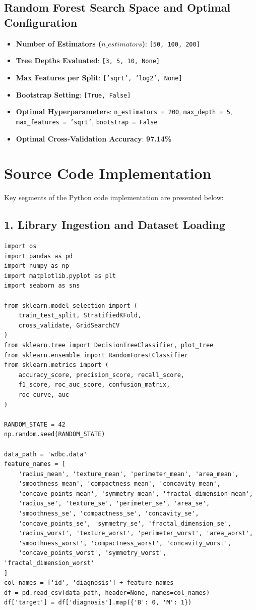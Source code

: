\documentclass[12pt,a4paper]{article}
\begin{document}
\subsection*{Random Forest Search Space and Optimal Configuration}
\begin{itemize}
\item \textbf{Number of Estimators ($n\_estimators$)}: \texttt{[50, 100, 200]}
\item \textbf{Tree Depths Evaluated}: \texttt{[3, 5, 10, None]}
\item \textbf{Max Features per Split}: \texttt{['sqrt', 'log2', None]}
\item \textbf{Bootstrap Setting}: \texttt{[True, False]}
\item \textbf{Optimal Hyperparameters}: \texttt{n\_estimators = 200}, \texttt{max\_depth = 5}, \texttt{max\_features = 'sqrt'}, \texttt{bootstrap = False}
\item \textbf{Optimal Cross-Validation Accuracy}: \textbf{97.14\%}
\end{itemize}

\section{Source Code Implementation}

Key segments of the Python code implementation are presented below:

\subsection*{1. Library Ingestion and Dataset Loading}
\begin{lstlisting}
import os
import pandas as pd
import numpy as np
import matplotlib.pyplot as plt
import seaborn as sns

from sklearn.model_selection import (
    train_test_split, StratifiedKFold,
    cross_validate, GridSearchCV
)
from sklearn.tree import DecisionTreeClassifier, plot_tree
from sklearn.ensemble import RandomForestClassifier
from sklearn.metrics import (
    accuracy_score, precision_score, recall_score,
    f1_score, roc_auc_score, confusion_matrix,
    roc_curve, auc
)

RANDOM_STATE = 42
np.random.seed(RANDOM_STATE)

data_path = 'wdbc.data'
feature_names = [
    'radius_mean', 'texture_mean', 'perimeter_mean', 'area_mean',
    'smoothness_mean', 'compactness_mean', 'concavity_mean',
    'concave_points_mean', 'symmetry_mean', 'fractal_dimension_mean',
    'radius_se', 'texture_se', 'perimeter_se', 'area_se',
    'smoothness_se', 'compactness_se', 'concavity_se',
    'concave_points_se', 'symmetry_se', 'fractal_dimension_se',
    'radius_worst', 'texture_worst', 'perimeter_worst', 'area_worst',
    'smoothness_worst', 'compactness_worst', 'concavity_worst',
    'concave_points_worst', 'symmetry_worst', 'fractal_dimension_worst'
]
col_names = ['id', 'diagnosis'] + feature_names
df = pd.read_csv(data_path, header=None, names=col_names)
df['target'] = df['diagnosis'].map({'B': 0, 'M': 1})
\end{lstlisting}
\end{document}
